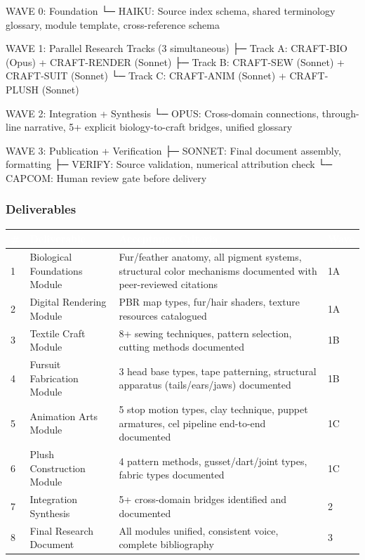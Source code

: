 \documentclass[11pt,letterpaper]{article}
\newcommand{\tableheader}[1]{\textbf{\sffamily\textcolor{white}{#1}}}
\begin{document}
\begin{asciibox}
WAVE 0: Foundation
  └─ HAIKU: Source index schema, shared terminology glossary,
     module template, cross-reference schema

WAVE 1: Parallel Research Tracks (3 simultaneous)
  ├─ Track A: CRAFT-BIO (Opus) + CRAFT-RENDER (Sonnet)
  ├─ Track B: CRAFT-SEW (Sonnet) + CRAFT-SUIT (Sonnet)
  └─ Track C: CRAFT-ANIM (Sonnet) + CRAFT-PLUSH (Sonnet)

WAVE 2: Integration + Synthesis
  └─ OPUS: Cross-domain connections, through-line narrative,
     5+ explicit biology-to-craft bridges, unified glossary

WAVE 3: Publication + Verification
  ├─ SONNET: Final document assembly, formatting
  ├─ VERIFY: Source validation, numerical attribution check
  └─ CAPCOM: Human review gate before delivery
\end{asciibox}

\subsubsection{Deliverables}

\begin{center}
\begin{tabularx}{\textwidth}{C{0.5cm}L{3.5cm}XC{2cm}}
\toprule
{}
\tableheader{\#} & \tableheader{Deliverable} & \tableheader{Acceptance Criteria} & \tableheader{Wave} \\
 & Biological Foundations Module & Fur/feather anatomy, all pigment systems, structural color mechanisms documented with peer-reviewed citations & 1A \\
2 & Digital Rendering Module & PBR map types, fur/hair shaders, texture resources catalogued & 1A \\
3 & Textile Craft Module & 8+ sewing techniques, pattern selection, cutting methods documented & 1B \\
4 & Fursuit Fabrication Module & 3 head base types, tape patterning, structural apparatus (tails/ears/jaws) documented & 1B \\
5 & Animation Arts Module & 5 stop motion types, clay technique, puppet armatures, cel pipeline end-to-end documented & 1C \\
6 & Plush Construction Module & 4 pattern methods, gusset/dart/joint types, fabric types documented & 1C \\
7 & Integration Synthesis & 5+ cross-domain bridges identified and documented & 2 \\
8 & Final Research Document & All modules unified, consistent voice, complete bibliography & 3 \\
\bottomrule
\end{tabularx}
\end{center}
\end{document}
